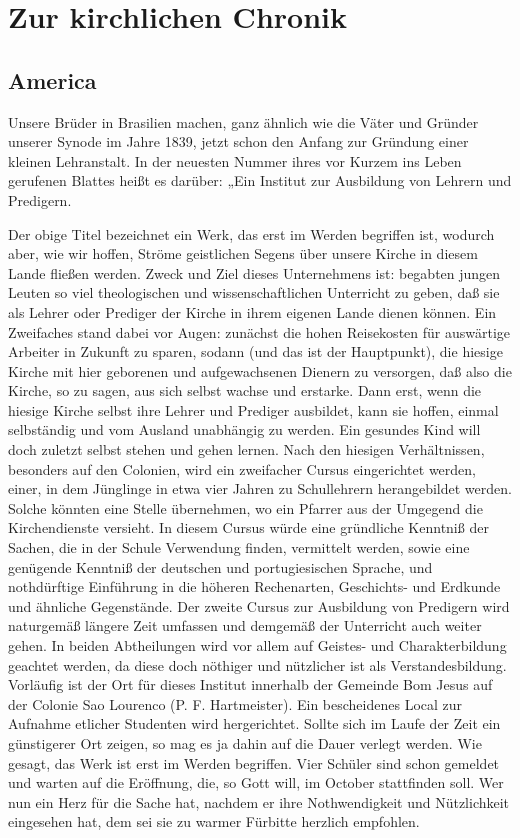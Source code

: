 \chapter{Zur kirchlichen Chronik}

\section{America}

Unsere Brüder in Brasilien machen, ganz ähnlich wie die Väter und Gründer unserer Synode im Jahre 1839, jetzt schon den Anfang zur Gründung einer kleinen Lehranstalt. In der neuesten Nummer ihres vor Kurzem ins Leben gerufenen Blattes heißt es darüber: „Ein Institut zur Ausbildung von Lehrern und Predigern.


Der obige Titel bezeichnet ein Werk, das erst im Werden begriffen ist, wodurch aber, wie wir hoffen, Ströme geistlichen Segens über unsere Kirche in diesem Lande fließen werden. Zweck und Ziel dieses Unternehmens ist: begabten jungen Leuten so viel theologischen und wissenschaftlichen Unterricht zu geben, daß sie als Lehrer oder Prediger der Kirche in ihrem eigenen Lande dienen können. Ein Zweifaches stand dabei vor Augen: zunächst die hohen Reisekosten für auswärtige Arbeiter in Zukunft zu sparen, sodann (und das ist der Hauptpunkt), die hiesige Kirche mit hier geborenen und aufgewachsenen Dienern zu versorgen, daß also die Kirche, so zu sagen, aus sich selbst wachse und erstarke. Dann erst, wenn die hiesige Kirche selbst ihre Lehrer und Prediger ausbildet, kann sie hoffen, einmal selbständig und vom Ausland unabhängig zu werden. Ein gesundes Kind will doch zuletzt selbst stehen und gehen lernen. Nach den hiesigen Verhältnissen, besonders auf den Colonien, wird ein zweifacher Cursus eingerichtet werden, einer, in dem Jünglinge in etwa vier Jahren zu Schullehrern herangebildet werden. Solche könnten eine Stelle übernehmen, wo ein Pfarrer aus der Umgegend die Kirchendienste versieht. In diesem Cursus würde eine gründliche Kenntniß der Sachen, die in der Schule Verwendung finden, vermittelt werden, sowie eine genügende Kenntniß der deutschen und portugiesischen Sprache, und nothdürftige Einführung in die höheren Rechenarten, Geschichts- und Erdkunde und ähnliche Gegenstände. Der zweite Cursus zur Ausbildung von Predigern wird naturgemäß längere Zeit umfassen und demgemäß der Unterricht auch weiter gehen. In beiden Abtheilungen wird vor allem auf Geistes- und Charakterbildung geachtet werden, da diese doch nöthiger und nützlicher ist als Verstandesbildung. Vorläufig ist der Ort für dieses Institut innerhalb der Gemeinde Bom Jesus auf der Colonie Sao Lourenco (P. F. Hartmeister). Ein bescheidenes Local zur Aufnahme etlicher Studenten wird hergerichtet. Sollte sich im Laufe der Zeit ein günstigerer Ort zeigen, so mag es ja dahin auf die Dauer verlegt werden. Wie gesagt, das Werk ist erst im Werden begriffen. Vier Schüler sind schon gemeldet und warten auf die Eröffnung, die, so Gott will, im October stattfinden soll. Wer nun ein Herz für die Sache hat, nachdem er ihre Nothwendigkeit und Nützlichkeit eingesehen hat, dem sei sie zu warmer Fürbitte herzlich empfohlen.

